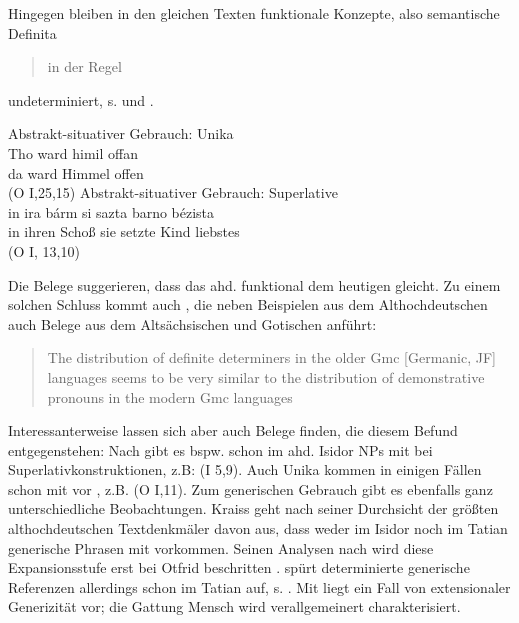 \noindent 
Hingegen bleiben in den gleichen Texten funktionale Konzepte, also semantische  Definita \blockcquote[114]{Demske2001}{in der Regel} undeterminiert, s.   und . 

\begin{exe} 
\ex \label{ex:demske-sem1} 
	Abstrakt-situativer Gebrauch: Unika  \\
	\gll Tho ward himil offan \\
		da ward Himmel offen \\
	\trans {} (O I,25,15)  
\ex \label{ex:demske-sem2} 
	Abstrakt-situativer Gebrauch:  Superlative \\
	\gll in ira bárm si sazta barno bézista \\
		 in ihren Schoß sie setzte Kind liebstes\\
	\trans  {} (O I, 13,10)
\end{exe}

\noindent 
Die Belege suggerieren, dass das ahd.  funktional dem heutigen  gleicht. Zu einem solchen Schluss kommt auch \textcite{Philippi1997}, die neben Beispielen aus dem Althochdeutschen auch Belege aus dem  Altsächsischen und Gotischen anführt: \blockcquote[86]{Philippi1997}{The distribution of definite determiners in the older Gmc [Germanic, JF] languages seems to be very similar to the distribution of demonstrative pronouns in the
modern Gmc languages}. 

Interessanterweise lassen sich aber auch Belege finden, die diesem Befund entgegenstehen: Nach \textcite{Kraiss2012} gibt es bspw. schon im ahd. Isidor NPs  mit  bei  Superlativkonstruktionen, z.B:   (I 5,9). Auch Unika kommen in einigen Fällen schon mit  vor \parencite[75]{Szczepaniak2011a}, z.B.   (O I,11). Zum generischen  Gebrauch gibt es ebenfalls ganz unterschiedliche Beobachtungen. Kraiss geht nach seiner Durchsicht der größten althochdeutschen Textdenkmäler davon aus, dass weder im Isidor noch im Tatian generische  Phrasen  mit  vorkommen. Seinen Analysen nach wird diese Expansionsstufe  erst bei Otfrid beschritten \parencite[133]{Kraiss2012}. \textcite[80]{Oubouzar1992} spürt determinierte generische  Referenzen allerdings schon im Tatian auf, s. . Mit  liegt ein Fall von extensionaler Generizität   vor; die Gattung Mensch wird verallgemeinert charakterisiert.  

